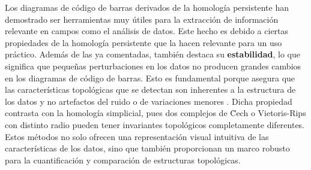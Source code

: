 %
%
Los diagramas de código de barras derivados de la homología persistente han demostrado ser herramientas muy útiles para la extracción de información relevante en campos como el análisis de datos. Este hecho es debido a ciertas propiedades de la homología persistente que la hacen relevante para un uso práctico. Además de las ya comentadas, también destaca su \textbf{estabilidad}, lo que significa que pequeñas perturbaciones en los datos no producen grandes cambios en los diagramas de código de barras. Esto es fundamental porque asegura que las características topológicas que se detectan son inherentes a la estructura de los datos y no artefactos del ruido o de variaciones menores \cite{cohen2005stability, chazal2016structure}. Dicha propiedad contrasta con la homología simplicial, pues dos complejos de \u Cech o Vietoris-Rips con distinto radio pueden tener invariantes topológicos completamente diferentes. Estos métodos no solo ofrecen una representación visual intuitiva de las características de los datos, sino que también proporcionan un marco robusto para la cuantificación y comparación de estructuras topológicas.

\endinput
